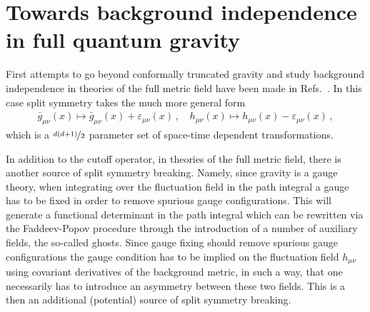 \documentclass[11pt]{book}
\numberwithin{equation}{chapter}
\begin{document}
\section{Towards background independence in full quantum gravity}

First attempts to go beyond conformally truncated gravity and study background
independence in theories of the full metric field have been made in
Refs.~\cite{Morris:2016spn, Percacci:2016arh}. In this case split symmetry
takes the much more general form
\begin{align}
  \bar g_{\mu \nu}(x) \mapsto \bar g_{\mu\nu}(x) + \varepsilon_{\mu\nu}(x) \,,
  \quad
  h_{\mu \nu}(x) \mapsto h_{\mu\nu}(x) - \varepsilon_{\mu\nu}(x) \,,
\end{align}
which is a $\nicefrac{d(d+1)}{2}$ parameter set of space-time dependent transformations.

In addition to the cutoff operator, in theories of the full metric field,
there is another source of split symmetry breaking. Namely, since gravity is a
gauge theory, when integrating over the fluctuation field in the path integral
a gauge has to be fixed in order to remove spurious gauge configurations.
This will generate a functional determinant in the path integral which can be rewritten via
the Faddeev-Popov procedure through the introduction of a number of auxiliary fields,
the so-called ghosts. Since gauge fixing should remove spurious gauge configurations
the gauge condition has to be implied on the fluctuation field $h_{\mu\nu}$ using
covariant derivatives of the background metric, in such a way, that one necessarily
has to introduce an asymmetry between these two fields. This is a then an additional
(potential) source of split symmetry breaking.
\end{document}
